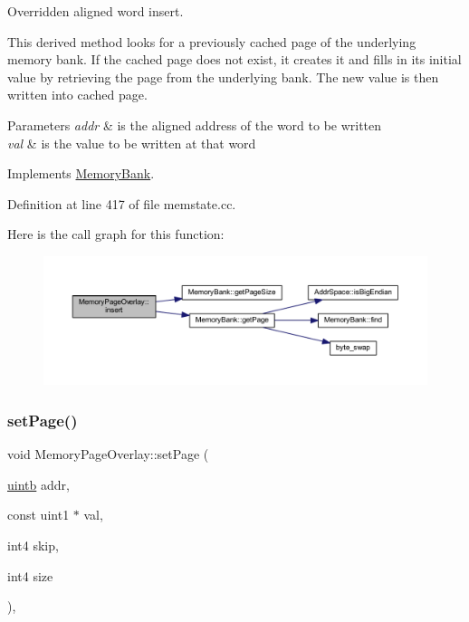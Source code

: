 Overridden aligned word insert. 

This derived method looks for a previously cached page of the underlying memory bank. If the cached page does not exist, it creates it and fills in its initial value by retrieving the page from the underlying bank. The new value is then written into cached page. 
\begin{DoxyParams}{Parameters}
{\em addr} & is the aligned address of the word to be written \\
\hline
{\em val} & is the value to be written at that word \\
\hline
\end{DoxyParams}


Implements \mbox{\hyperlink{class_memory_bank_abccbb8ba1e2c2ae941b372e90f454e5f}{Memory\+Bank}}.



Definition at line 417 of file memstate.\+cc.

Here is the call graph for this function\+:
\nopagebreak
\begin{figure}[H]
\begin{center}
\leavevmode
\includegraphics[width=350pt]{class_memory_page_overlay_a4dad83693ae5fe82459e9bdcb3f2415f_cgraph}
\end{center}
\end{figure}
\mbox{\label{class_memory_page_overlay_a1d713334ec06e47cfdfcf76f0649eb71}} 
\subsubsection{\texorpdfstring{setPage()}{setPage()}}
{\footnotesize\ttfamily void Memory\+Page\+Overlay\+::set\+Page (\begin{DoxyParamCaption}\item[{\mbox{\hyperlink{types_8h_a2db313c5d32a12b01d26ac9b3bca178f}{uintb}}}]{addr,  }\item[{const uint1 $\ast$}]{val,  }\item[{int4}]{skip,  }\item[{int4}]{size }\end{DoxyParamCaption})\hspace{0.3cm}{\ttfamily [protected]}, {\ttfamily [virtual]}}




